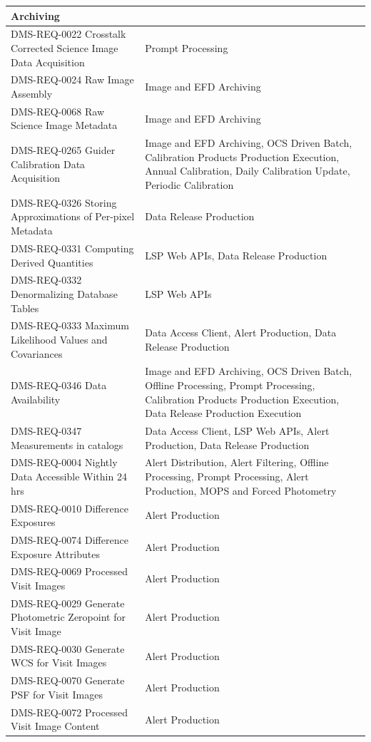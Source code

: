 \documentclass[DM,lsstdraft,toc]{lsstdoc}
\begin{document}
\begin{xtabular}{|p{0.4\textwidth}|p{0.55\textwidth}|}
Archiving\\ \hline
DMS-REQ-0022 Crosstalk Corrected Science Image Data Acquisition & Prompt
Processing\\ \hline
DMS-REQ-0024 Raw Image Assembly & Image and EFD Archiving\\ \hline
DMS-REQ-0068 Raw Science Image Metadata & Image and EFD
Archiving\\ \hline
DMS-REQ-0265 Guider Calibration Data Acquisition & Image and EFD
Archiving, OCS Driven Batch, Calibration Products Production Execution,
Annual Calibration, Daily Calibration Update, Periodic
Calibration\\ \hline
DMS-REQ-0326 Storing Approximations of Per-pixel Metadata & Data Release
Production\\ \hline
DMS-REQ-0331 Computing Derived Quantities & LSP Web APIs, Data
Release Production\\ \hline
DMS-REQ-0332 Denormalizing Database Tables & LSP Web APIs\\ \hline
DMS-REQ-0333 Maximum Likelihood Values and Covariances & Data Access
Client, Alert Production, Data Release Production\\ \hline
DMS-REQ-0346 Data Availability & Image and EFD Archiving, OCS Driven
Batch, Offline Processing, Prompt Processing, Calibration Products
Production Execution, Data Release Production Execution\\ \hline
DMS-REQ-0347 Measurements in catalogs & Data Access Client, LSP Web APIs,
Alert Production, Data Release Production\\ \hline
DMS-REQ-0004 Nightly Data Accessible Within 24 hrs & Alert Distribution,
Alert Filtering, Offline Processing, Prompt Processing, Alert
Production, MOPS and Forced Photometry\\ \hline
DMS-REQ-0010 Difference Exposures & Alert Production\\ \hline
DMS-REQ-0074 Difference Exposure Attributes & Alert
Production\\ \hline
DMS-REQ-0069 Processed Visit Images & Alert Production\\ \hline
DMS-REQ-0029 Generate Photometric Zeropoint for Visit Image & Alert
Production\\ \hline
DMS-REQ-0030 Generate WCS for Visit Images & Alert
Production\\ \hline
DMS-REQ-0070 Generate PSF for Visit Images & Alert
Production\\ \hline
DMS-REQ-0072 Processed Visit Image Content & Alert
Production\\ \hline

\end{xtabular}
\end{document}
